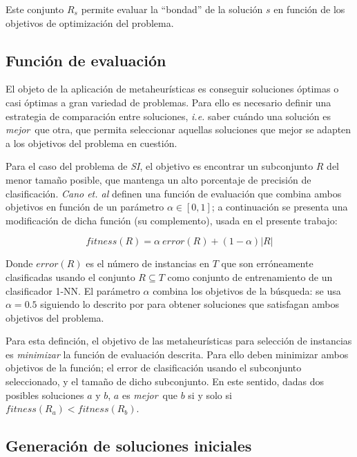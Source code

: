 Este conjunto $R_s$ permite evaluar la ``bondad'' de la solución $s$ en función de los objetivos de optimización del problema.

\subsection{Función de evaluación}

El objeto de la aplicación de metaheurísticas es conseguir soluciones óptimas o casi óptimas a gran variedad de problemas. Para ello es necesario definir una estrategia de comparación entre soluciones, \emph{i.e.} saber cuándo una solución es \guillemotleft\emph{mejor}\guillemotright\ que otra, que permita seleccionar aquellas soluciones que mejor se adapten a los objetivos del problema en cuestión.

Para el caso del problema de \emph{SI}, el objetivo es encontrar un subconjunto $R$ del menor tamaño posible, que mantenga un alto porcentaje de precisión de clasificación. \emph{Cano et. al} \cite{cano2003using} definen una función de evaluación que combina ambos objetivos en función de un parámetro $\alpha \in [0,1]$; a continuación se presenta una modificación de dicha función (su complemento), usada en el presente trabajo:

\begin{equation}
\mathit{fitness}(R) = \alpha\ \mathit{error}(R) + (1 - \alpha) \vert R \vert
\end{equation}

Donde $\mathit{error}(R)$ es el número de instancias en $T$ que son erróneamente clasificadas usando el conjunto $R \subseteq T$ como conjunto de entrenamiento de un clasificador 1-NN. El parámetro $\alpha$ combina los objetivos de la búsqueda: se usa $\alpha = 0.5$ siguiendo lo descrito por \cite{cano2003using} para obtener soluciones que satisfagan ambos objetivos del problema.

Para esta definción, el objetivo de las metaheurísticas para selección de instancias es \emph{minimizar} la función de evaluación descrita. Para ello deben minimizar ambos objetivos de la función; el error de clasificación usando el subconjunto seleccionado, y el tamaño de dicho subconjunto. En este sentido, dadas dos posibles soluciones $a$ y $b$, $a$ es \guillemotleft\emph{mejor}\guillemotright\ que $b$ si y solo si $\mathit{fitness}(R_a) < \mathit{fitness}(R_b)$.

\subsection{Generación de soluciones iniciales}
\label{generacion-sol-inic}

